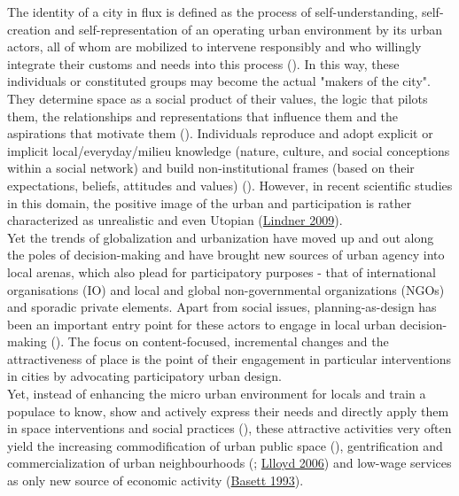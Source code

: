 \documentclass[11pt]{report}
\begin{document}
{{{The identity of a city in flux is defined as the process of self-understanding, self-creation and self-representation of an operating urban environment by its urban actors, all of whom are mobilized to intervene responsibly and who willingly integrate their customs and needs into this process
(\href{Bolay}{\citealt{bolay_urban_2005}}).
In this way, these individuals or constituted groups may become the actual "makers of the city".
They determine space as a social product of their values, the logic that pilots them, the relationships and representations that influence them and the aspirations that motivate them (\href{Lefebvre}{\citealt{lefebvre_production_1974}}).
Individuals reproduce and adopt explicit or implicit local/everyday/milieu knowledge (nature, culture, and social conceptions within a social network) and build non-institutional frames (based on their expectations, beliefs, attitudes and values) (\href{Getimis}{\citealt{getimis_comparing_2012}}).
However, in recent scientific studies in this domain, the  positive image of the urban and participation is rather characterized as unrealistic and even Utopian
(\href{Lindner}{Lindner 2009}).
\\

Yet the trends of globalization and urbanization have moved up and out along the poles of decision-making and have brought new sources of urban agency into local arenas, which also plead for participatory purposes - that of international organisations (IO) and local and global non-governmental organizations (NGOs) and sporadic private elements. Apart from social issues, planning-as-design has been an important entry point for these actors to engage in local urban decision-making 
(\href{Van}{\citealt{van_assche_co-evolutions_2013}}).
The focus on content-focused, incremental changes  and the attractiveness of place is the point of their engagement in particular interventions in cities by advocating participatory urban design.
\\

Yet, instead of enhancing the micro urban environment for locals and train a populace to know, show and actively express their needs and directly apply them in space interventions and social practices
(\href{Ostrom}{\citealt{ostrom_governing_1995}}),
these attractive activities very often yield the increasing commodification of urban public space
(\href{Lehrer}{\citealt{lehrer_old_2008}}),
gentrification and commercialization of urban neighbourhoods
(\href{Zukin}{\citealt{zukin_cultures_1995}}; \href{Lloyd}{Llloyd 2006})
and low-wage services as only new source of economic activity
(\href{Basett}{Basett 1993}).

}}}
\end{document}
